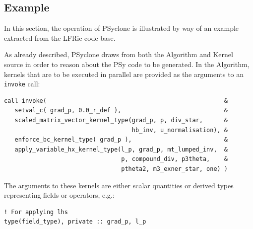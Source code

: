 \documentclass[times]{elsarticle}
\begin{document}
\subsection{Example}

In this section, the operation of PSyclone is illustrated by way of
an example extracted from the LFRic code base.

As already described, PSyclone draws from both the Algorithm and
Kernel source in order to reason about the PSy code to be generated.
In the Algorithm, kernels that are to be executed in parallel are
provided as the arguments to an \texttt{invoke} call:

\begin{lstlisting}
call invoke(                                                  &
   setval_c( grad_p, 0.0_r_def ),                             &
   scaled_matrix_vector_kernel_type(grad_p, p, div_star,      &
                                    hb_inv, u_normalisation), &
   enforce_bc_kernel_type( grad_p ),                          &
   apply_variable_hx_kernel_type(l_p, grad_p, mt_lumped_inv,  &
                                 p, compound_div, p3theta,    &
                                 ptheta2, m3_exner_star, one) )
\end{lstlisting}

The arguments to these kernels are either scalar quantities or
derived types representing fields or operators, e.g.:

\begin{lstlisting}
! For applying lhs
type(field_type), private :: grad_p, l_p
\end{lstlisting}
\end{document}
